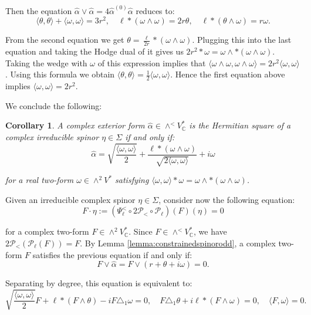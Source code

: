 \documentclass[10pt,a4paper,twoside,reqno]{amsart}
\theoremstyle{plain}
\newtheorem{cor}[thm]{Corollary}
\theoremstyle{definition}
\theoremstyle{remark}
\def\C{\mathbb{C}}
\def\cP{\mathcal{P}}
\def\cP{\mathcal{P}}
\newcommand{\escal}[1]{\langle#1\rangle}
\begin{document}
Then the equation $\widehat{\alpha}\vee\widehat{\alpha}=4\widehat{\alpha}^{(0)}\widehat{\alpha}$ reduces to: $$\escal{\theta,\theta}+\escal{\omega,\omega}=3r^2,\quad\ell*(\omega\wedge\omega)=2r\theta,\quad\ell*(\theta\wedge\omega)=r\omega.$$

From the second equation we get $\theta=\frac{\ell}{2r}*(\omega\wedge\omega)$. Plugging this into the last equation and taking the Hodge dual of it gives us $2r^2*\omega=\omega\wedge*(\omega\wedge\omega)$. Taking the wedge with $\omega$ of this expression implies that $\escal{\omega\wedge\omega,\omega\wedge\omega}=2r^2\escal{\omega,\omega}$. Using this formula we obtain $\escal{\theta,\theta}=\frac{1}{2}\escal{\omega,\omega}$. Hence the first equation above implies $\escal{\omega,\omega}=2r^2$.\medskip

We conclude the following:

\begin{cor}
\label{cor:Hermitian5d}
A complex exterior form $\widehat{\alpha}\in\wedge^<V^*_\C$ is the Hermitian square of a complex irreducible spinor $\eta\in\Sigma$ if and only if:
\begin{equation*}
\widehat{\alpha} = \sqrt{\frac{\escal{\omega,\omega}}{2}} + \frac{\ell *(\omega\wedge\omega)}{\sqrt{2\escal{\omega,\omega}}}+i\omega
\end{equation*}

\noindent
for a real two-form $\omega\in\wedge^2V^*$ satisfying $\escal{\omega,\omega} \ast \omega = \omega\wedge*(\omega\wedge\omega)$.
\end{cor}

\noindent
Given an irreducible complex spinor $\eta\in \Sigma$, consider now the following equation:
\begin{equation*}
F\cdot\eta:=(\Psi_{\ell}^< \circ 2\cP_{<} \circ \cP_{\ell})(F)(\eta)=0
\end{equation*}

\noindent
for a complex two-form $F\in \wedge^2 V^{\ast}_{\mathbb{C}}$. Since $F\in\wedge^<V_\C^*$, we have $2\cP_<(\cP_\ell(F))=F$. By Lemma \ref{lemma:constrainedspinorodd}, a complex two-form $F$ satisfies the previous equation if and only if:
\begin{equation*}
F\vee\widehat{\alpha}=F\vee(r+\theta+i\omega)=0.
\end{equation*}

\noindent
Separating by degree, this equation is equivalent to: $$\sqrt{\frac{\escal{\omega,\omega}}{2}} F + \ell*(F\wedge\theta)-iF\triangle_1\omega=0,\quad F\triangle_1\theta+i\ell*(F\wedge\omega)=0,\quad\escal{F,\omega}=0.$$
\end{document}
